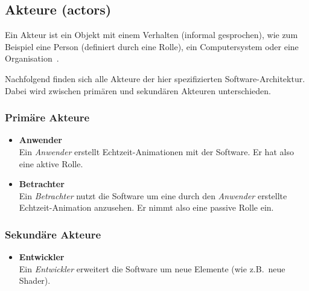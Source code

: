 
\subsection{Akteure (actors)}
\label{subsec:requirements:actors}

Ein Akteur ist ein Objekt mit einem Verhalten (informal gesprochen), wie zum
Beispiel eine Person (definiert durch eine Rolle), ein Computersystem oder eine
Organisation~\cite[S.63]{larman_applying_2004}.

Nachfolgend finden sich alle Akteure der hier spezifizierten
Software-Architektur. Dabei wird zwischen primären und sekundären Akteuren
unterschieden.

\subsubsection{Primäre Akteure}
\label{ssubsec:requirements:actors:primary}

\begin{itemize}
    \item{%
            \textbf{Anwender}\\
            Ein \textit{Anwender} erstellt Echtzeit-Animationen mit der
            Software. Er hat also eine aktive Rolle.
        }
    \item{%
            \textbf{Betrachter}\\
            Ein \textit{Betrachter} nutzt die Software um eine durch den
            \textit{Anwender} erstellte Echtzeit-Animation anzusehen. Er nimmt
            also eine passive Rolle ein.
        }
\end{itemize}

\subsubsection{Sekundäre Akteure}
\label{ssubsec:requirements:actors:secondary}

\begin{itemize}
    \item{%
            \textbf{Entwickler}\\
            Ein \textit{Entwickler} erweitert die Software um neue Elemente
            (wie z.B.\ neue Shader).
        }
\end{itemize}

